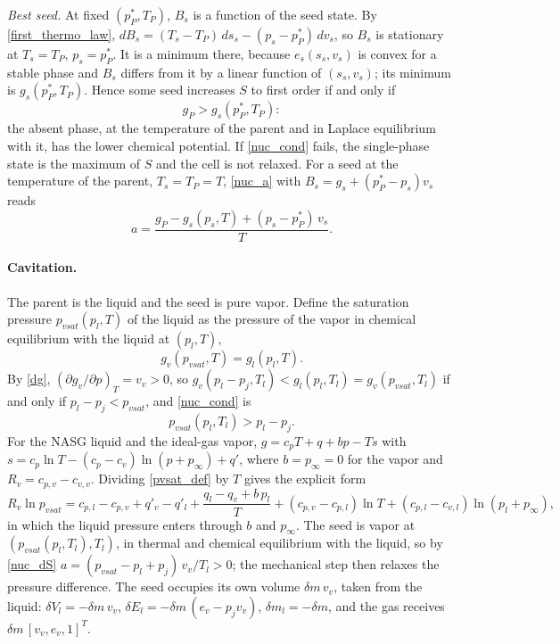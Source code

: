 \emph{Best seed.} At fixed $(p_P^*,T_P)$, $B_s$ is a function of the seed state. By \eqref{first_thermo_law}, $dB_s=(T_s-T_P)\,ds_s-(p_s-p_P^*)\,dv_s$, so $B_s$ is stationary at $T_s=T_P$, $p_s=p_P^*$. It is a minimum there, because $e_s(s_s,v_s)$ is convex for a stable phase and $B_s$ differs from it by a linear function of $(s_s,v_s)$; its minimum is $g_s(p_P^*,T_P)$. Hence some seed increases $S$ to first order if and only if
\begin{equation}\label{nuc_cond}
g_P>g_s(p_P^*,T_P):
\end{equation}
the absent phase, at the temperature of the parent and in Laplace equilibrium with it, has the lower chemical potential. If \eqref{nuc_cond} fails, the single-phase state is the maximum of $S$ and the cell is not relaxed. For a seed at the temperature of the parent, $T_s=T_P=T$, \eqref{nuc_a} with $B_s=g_s+(p_P^*-p_s)v_s$ reads
\begin{equation}\label{nuc_dS}
a=\frac{g_P-g_s(p_s,T)+(p_s-p_P^*)\,v_s}{T}.
\end{equation}

\paragraph{Cavitation.}
The parent is the liquid and the seed is pure vapor. Define the saturation pressure $p_{vsat}(p_l,T)$ of the liquid as the pressure of the vapor in chemical equilibrium with the liquid at $(p_l,T)$,
\begin{equation}\label{pvsat_def}
g_v(p_{vsat},T)=g_l(p_l,T).
\end{equation}
By \eqref{dg}, $(\partial g_v/\partial p)_T=v_v>0$, so $g_v(p_l-p_{j},T_l)<g_l(p_l,T_l)=g_v(p_{vsat},T_l)$ if and only if $p_l-p_{j}<p_{vsat}$, and \eqref{nuc_cond} is
\begin{equation}\label{cav_crit}
p_{vsat}(p_l,T_l)>p_l-p_{j} .
\end{equation}
For the NASG liquid and the ideal-gas vapor, $g=c_pT+q+bp-Ts$ with $s=c_p\ln T-(c_p-c_v)\ln(p+p_\infty)+q'$, where $b=p_\infty=0$ for the vapor and $R_v=c_{p,v}-c_{v,v}$. Dividing \eqref{pvsat_def} by $T$ gives the explicit form
\begin{equation}\label{pvsat_nasg}
R_v\ln p_{vsat}=c_{p,l}-c_{p,v}+q'_v-q'_l+\frac{q_l-q_v+b\,p_l}{T}+(c_{p,v}-c_{p,l})\ln T+(c_{p,l}-c_{v,l})\ln(p_l+p_\infty),
\end{equation}
in which the liquid pressure enters through $b$ and $p_\infty$. The seed is vapor at $(p_{vsat}(p_l,T_l),T_l)$, in thermal and chemical equilibrium with the liquid, so by \eqref{nuc_dS} $a=(p_{vsat}-p_l+p_{j})\,v_v/T_l>0$; the mechanical step then relaxes the pressure difference. The seed occupies its own volume $\delta m\,v_v$, taken from the liquid: $\delta V_l=-\delta m\,v_v$, $\delta E_l=-\delta m\,(e_v-p_{j}v_v)$, $\delta m_l=-\delta m$, and the gas receives $\delta m\,[v_v,e_v,1]^T$.

